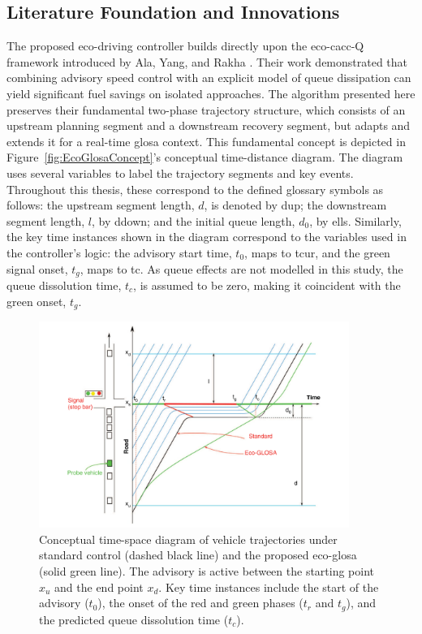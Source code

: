 \subsection{Literature Foundation and Innovations}
\label{sec:EcoGlosa_Background}

The proposed eco-driving controller builds directly upon the eco-\ac{cacc}-Q framework introduced by Ala, Yang, and Rakha \cite{Ala2016}. Their work demonstrated that combining advisory speed control with an explicit model of queue dissipation can yield significant fuel savings on isolated approaches. The algorithm presented here preserves their fundamental two-phase trajectory structure, which consists of an upstream planning segment and a downstream recovery segment, but adapts and extends it for a real-time \ac{glosa} context.
\mynewline
This fundamental concept is depicted in Figure~\vref{fig:EcoGlosaConcept}'s conceptual time-distance diagram. The diagram uses several variables to label the trajectory segments and key events. Throughout this thesis, these correspond to the defined glossary symbols as follows: the upstream segment length, $d$, is denoted by \gls{dup}; the downstream segment length, $l$, by \gls{ddown}; and the initial queue length, $d_0$, by \gls{ells}. Similarly, the key time instances shown in the diagram correspond to the variables used in the controller's logic: the advisory start time, $t_0$, maps to \gls{tcur}, and the green signal onset, $t_g$, maps to \gls{tc}. As queue effects are not modelled in this study, the queue dissolution time, $t_c$, is assumed to be zero, making it coincident with the green onset, $t_g$.
\mynewline

\begin{figure}[htb]
    \centering
    \includegraphics[width=0.9\textwidth]{data/img/GLOSA/ECO-GLOSA.pdf}
    \caption[Conceptual time-space diagram for the Eco-GLOSA algorithm]{%
        Conceptual time-space diagram of vehicle trajectories under standard control (dashed black line) and the proposed \ac{eco-glosa} (solid green line). The advisory is active between the starting point $x_u$ and the end point $x_d$. Key time instances include the start of the advisory ($t_0$), the onset of the red and green phases ($t_r$ and $t_g$), and the predicted queue dissolution time ($t_c$). \cite{Ala2016}
    }
    \label{fig:EcoGlosaConcept}
\end{figure}

